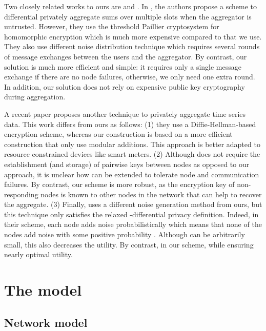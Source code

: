 \documentclass[11pt,a4paper]{article}
\theoremstyle{plain}
\theoremstyle{plain}
\theoremstyle{plain}
\theoremstyle{plain}
\theoremstyle{nonumberplain} \theoremseparator{}
\begin{document}
Two closely related works to ours are \cite{rashtogi10sigmod} and \cite{shi11ndss}.
In \cite{rashtogi10sigmod}, the authors propose a scheme to differential privately aggregate sums over multiple slots when the aggregator is untrusted. However, they use the threshold Paillier cryptosystem \cite{fougue00paillier} for homomorphic encryption which is much more expensive compared to  \cite{cc05mobiquitous} that we use.
They also use different noise distribution technique which requires several rounds of message exchanges between the users and the aggregator. 
By contrast, our solution is much more efficient and simple: it requires only a single message exchange if there are no node failures, otherwise, we only need one extra round. In addition, our solution does not rely on expensive public key cryptography during aggregation.  

A recent paper \cite{shi11ndss} proposes another technique to privately aggregate time series data. This work differs from ours as follows: 
(1) they use a Diffie-Hellman-based encryption scheme, whereas our construction is based on a more efficient construction that only use modular
 additions. This approach is better adapted to resource constrained devices like smart meters.   
(2) Although \cite{shi11ndss} does not require the establishment (and storage) of pairwise keys between nodes as opposed to our approach, 
it is unclear how \cite{shi11ndss} can be extended to tolerate node and communication failures. By contrast, our scheme is more robust, as the encryption key of non-responding nodes is known to other nodes in the network that can help to recover the aggregate. 
(3) Finally, \cite{shi11ndss} uses a different noise generation method from ours, but this technique only satisfies the relaxed -differential privacy definition. Indeed, in their scheme, each node adds noise probabilistically which means that none of the nodes add noise with some positive probability . Although  can be arbitrarily small, this also decreases the utility. By contrast, in our scheme,  while ensuring nearly optimal utility.

\section{The model}

\subsection{Network model}
\end{document}
